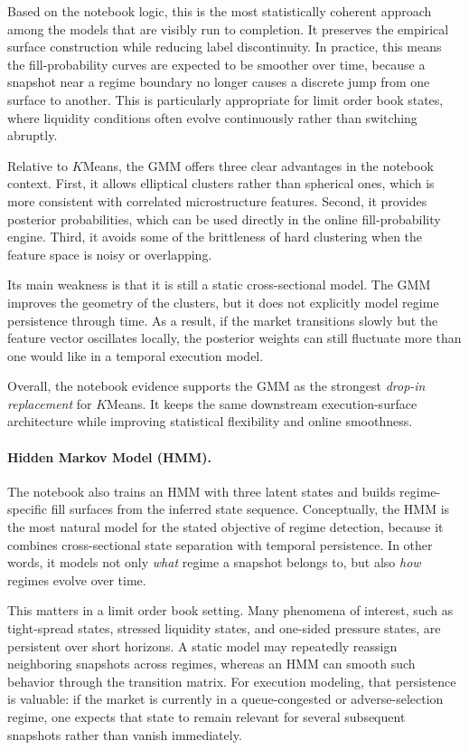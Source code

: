 \documentclass[12pt,a4paper]{report}
\begin{document}
Based on the notebook logic, this is the most statistically coherent approach among the models that are visibly run to completion. It preserves the empirical surface construction while reducing label discontinuity. In practice, this means the fill-probability curves are expected to be smoother over time, because a snapshot near a regime boundary no longer causes a discrete jump from one surface to another. This is particularly appropriate for limit order book states, where liquidity conditions often evolve continuously rather than switching abruptly.

Relative to $K$Means, the GMM offers three clear advantages in the notebook context. First, it allows elliptical clusters rather than spherical ones, which is more consistent with correlated microstructure features. Second, it provides posterior probabilities, which can be used directly in the online fill-probability engine. Third, it avoids some of the brittleness of hard clustering when the feature space is noisy or overlapping.

Its main weakness is that it is still a static cross-sectional model. The GMM improves the geometry of the clusters, but it does not explicitly model regime persistence through time. As a result, if the market transitions slowly but the feature vector oscillates locally, the posterior weights can still fluctuate more than one would like in a temporal execution model.

Overall, the notebook evidence supports the GMM as the strongest \emph{drop-in replacement} for $K$Means. It keeps the same downstream execution-surface architecture while improving statistical flexibility and online smoothness.

\paragraph{Hidden Markov Model (HMM).}
The notebook also trains an HMM with three latent states and builds regime-specific fill surfaces from the inferred state sequence. Conceptually, the HMM is the most natural model for the stated objective of regime detection, because it combines cross-sectional state separation with temporal persistence. In other words, it models not only \emph{what} regime a snapshot belongs to, but also \emph{how} regimes evolve over time.

This matters in a limit order book setting. Many phenomena of interest, such as tight-spread states, stressed liquidity states, and one-sided pressure states, are persistent over short horizons. A static model may repeatedly reassign neighboring snapshots across regimes, whereas an HMM can smooth such behavior through the transition matrix. For execution modeling, that persistence is valuable: if the market is currently in a queue-congested or adverse-selection regime, one expects that state to remain relevant for several subsequent snapshots rather than vanish immediately.
\end{document}
